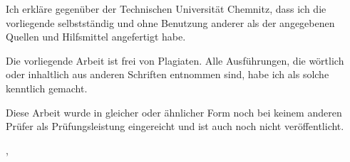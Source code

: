 \begin{tucerklaerung}
  \vspace{1em}\noindent
  Ich erkläre gegenüber der Technischen Universität Chemnitz, dass ich die
  vorliegende \thesistype{} selbstständig und ohne Benutzung anderer
  als der angegebenen Quellen und Hilfsmittel angefertigt habe.

  \vspace{1em}\noindent
  Die vorliegende Arbeit ist frei von Plagiaten. Alle Ausführungen, die wörtlich
  oder inhaltlich aus anderen Schriften entnommen sind, habe ich als solche
  kenntlich gemacht.

  \vspace{1em}\noindent
  Diese Arbeit wurde in gleicher oder ähnlicher Form noch bei keinem anderen
  Prüfer als Prüfungsleistung eingereicht und ist auch noch nicht veröffentlicht.


  \begin{flushright}
    \place, \makeatletter\@date\makeatother
  \end{flushright}

\end{tucerklaerung}
